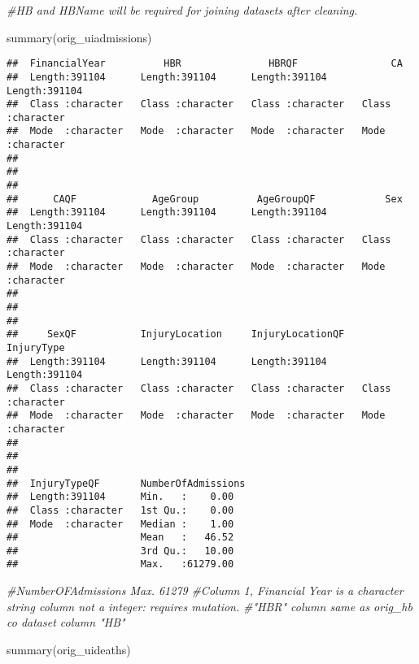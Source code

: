 \documentclass[
]{article}
\newenvironment{Shaded}{\begin{snugshade}}{\end{snugshade}}
\newcommand{\CommentTok}[1]{\textcolor[rgb]{0.56,0.35,0.01}{\textit{#1}}}
\newcommand{\FunctionTok}[1]{\textcolor[rgb]{0.00,0.00,0.00}{#1}}
\newcommand{\NormalTok}[1]{#1}
\begin{document}
\begin{Shaded}
\begin{Highlighting}[]
\CommentTok{\#HB and HBName will be required for joining datasets after cleaning.}

\FunctionTok{summary}\NormalTok{(orig\_uiadmissions)}
\end{Highlighting}
\end{Shaded}

\begin{verbatim}
##  FinancialYear          HBR               HBRQF                CA           
##  Length:391104      Length:391104      Length:391104      Length:391104     
##  Class :character   Class :character   Class :character   Class :character  
##  Mode  :character   Mode  :character   Mode  :character   Mode  :character  
##                                                                             
##                                                                             
##                                                                             
##      CAQF             AgeGroup          AgeGroupQF            Sex           
##  Length:391104      Length:391104      Length:391104      Length:391104     
##  Class :character   Class :character   Class :character   Class :character  
##  Mode  :character   Mode  :character   Mode  :character   Mode  :character  
##                                                                             
##                                                                             
##                                                                             
##     SexQF           InjuryLocation     InjuryLocationQF    InjuryType       
##  Length:391104      Length:391104      Length:391104      Length:391104     
##  Class :character   Class :character   Class :character   Class :character  
##  Mode  :character   Mode  :character   Mode  :character   Mode  :character  
##                                                                             
##                                                                             
##                                                                             
##  InjuryTypeQF       NumberOfAdmissions
##  Length:391104      Min.   :    0.00  
##  Class :character   1st Qu.:    0.00  
##  Mode  :character   Median :    1.00  
##                     Mean   :   46.52  
##                     3rd Qu.:   10.00  
##                     Max.   :61279.00
\end{verbatim}

\begin{Shaded}
\begin{Highlighting}[]
\CommentTok{\#NumberOFAdmissions Max. 61279}
\CommentTok{\#Column 1, Financial Year is a character string column not a integer: requires mutation. }
\CommentTok{\#"HBR" column same as orig\_hb co dataset column "HB"}


\FunctionTok{summary}\NormalTok{(orig\_uideaths)}
\end{Highlighting}
\end{Shaded}
\end{document}
